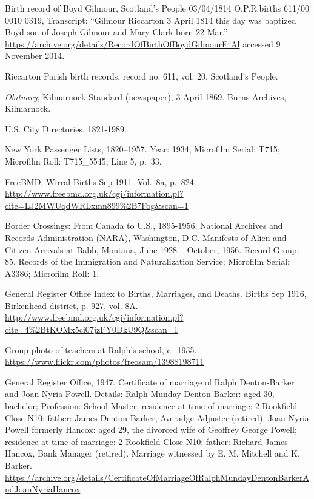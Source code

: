 \begin{thebibliography}{99}
	Birth record of Boyd Gilmour,
	Scotland's People 03/04/1814 O.P.R.births 611/00 0010 0319,
	Transcript: ``Gilmour Riccarton 3 April 1814 this day was baptized Boyd son of Joseph Gilmour and Mary Clark born 22 Mar.''
	\url{https://archive.org/details/RecordOfBirthOfBoydGilmourEtAl} accessed 9 November 2014.

	Riccarton Parish birth records, record no. 611, vol. 20. Scotland's People.

	\emph{Obituary}, Kilmarnock Standard (newspaper), 3 April 1869. Burns Archives, Kilmarnock.

	U.S. City Directories, 1821-1989.

	New York Passenger Lists, 1820--1957. Year: 1934; Microfilm Serial: T715; Microfilm Roll: T715\_5545; Line 5, p.\ 33.

	FreeBMD, Wirral Births Sep 1911. Vol.\ 8a, p.\ 824.
	\url{http://www.freebmd.org.uk/cgi/information.pl?cite=LJ2MWUqdWRLxmn899\%2B7Fog&scan=1}


	Border Crossings: From Canada to U.S., 1895-1956.
	National Archives and Records Administration (NARA), Washington, D.C.
	Manifests of Alien and Citizen Arrivals at Babb, Montana, June 1928 -- October, 1956.
	Record Group: 85, Records of the Immigration and Naturalization Service; Microfilm Serial: A3386; Microfilm Roll: 1.

	General Register Office Index to Births, Marriages, and Deaths.
	Births Sep 1916, Birkenhead district, p. 927, vol. 8A.
	\url{http://www.freebmd.org.uk/cgi/information.pl?cite=4\%2BtKOMx5ci07jzFY0DkU9Q&scan=1}

	Group photo of teachers at Ralph's school, c.\ 1935.
	\url{https://www.flickr.com/photos/freosam/13988198711}

	General Register Office, 1947. Certificate of marriage of Ralph Denton-Barker and Joan Nyria Powell.
	Details: Ralph Munday Denton Barker: aged 30, bachelor; Profession: School Master;
	residence at time of marriage: 2 Rookfield Close N10; father: James Denton Barker, Averadge Adjuster (retired).
	Joan Nyria Powell formerly Hancox: aged 29, the divorced wife of Geoffrey George Powell;
	residence at time of marriage: 2 Rookfield Close N10; father: Richard James Hancox, Bank Manager (retired).
	Marriage witnessed by E. M. Mitchell and K. Barker.
	\url{https://archive.org/details/CertificateOfMarriageOfRalphMundayDentonBarkerAndJoanNyriaHancox}


\end{thebibliography}
